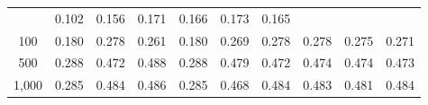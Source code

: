 \documentclass{article}
\numberwithin{equation}{section}
\begin{document}
\begin{table}[ht]
\begin{tabular}{c|ccc|cccccc}
& 0.102 & 0.156 & 0.171 & 0.166 & 0.173 & 0.165 \\
100
& 0.180 & 0.278 & 0.261
& 0.180 & 0.269 & 0.278 & 0.278 & 0.275 & 0.271 \\
500
& 0.288 & \cellcolor{covheat!86!white}0.472 & \cellcolor{covheat!94!white}0.488
& 0.288 & \cellcolor{covheat!89!white}0.479 & \cellcolor{covheat!86!white}0.472 & \cellcolor{covheat!87!white}0.474 & \cellcolor{covheat!87!white}0.474 & \cellcolor{covheat!86!white}0.473 \\
1{,}000
& 0.285 & \cellcolor{covheat!92!white}0.484 & \cellcolor{covheat!93!white}0.486
& 0.285 & \cellcolor{covheat!84!white}0.468 & \cellcolor{covheat!92!white}0.484 & \cellcolor{covheat!91!white}0.483 & \cellcolor{covheat!90!white}0.481 & \cellcolor{covheat!92!white}0.484 \\
\hline
\end{tabular}
\end{table}
\end{document}
